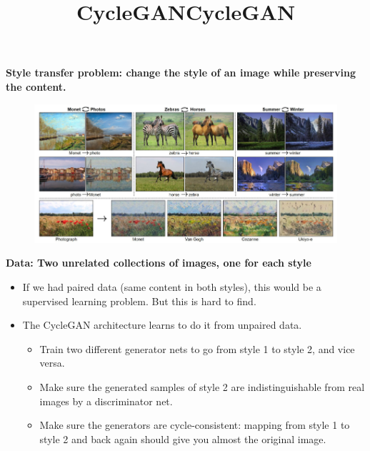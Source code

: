 \begin{frame}
    \title{CycleGAN}
    \textbf{Style transfer problem: change the style of an image while preserving the content.}
	\begin{figure}[h!]
		\includegraphics[scale=0.40]{images/cyclegan1.png}
	\end{figure}
    \textbf{Data: Two unrelated collections of images, one for each style}
\end{frame}

\begin{frame}
    \title{CycleGAN}
    \begin{itemize}
        \item If we had paired data (same content in both styles), this would be a supervised learning problem. But this is hard to find.
        \item The CycleGAN architecture learns to do it from unpaired data.
        \begin{itemize}
            \item Train two different generator nets to go from style 1 to style 2, and vice versa.
            \item Make sure the generated samples of style 2 are indistinguishable from real images by a discriminator net.
            \item Make sure the generators are cycle-consistent: mapping from style 1 to style 2 and back again should give you almost the original image.
        \end{itemize}
    \end{itemize}
\end{frame}

